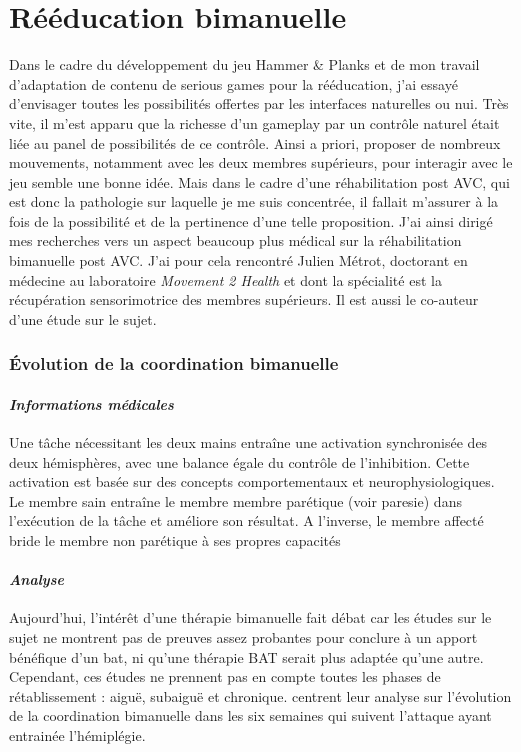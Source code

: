 	
\section{Rééducation bimanuelle} \label{bilateral}
	Dans le cadre du développement du jeu Hammer \& Planks et de mon travail d'adaptation de contenu de serious games pour la rééducation, j'ai essayé d'envisager toutes les possibilités offertes par les interfaces naturelles ou \gls{nui}. Très vite, il m'est apparu que la richesse d'un gameplay par un contrôle naturel était liée au panel de possibilités de ce contrôle. Ainsi a priori, proposer de nombreux mouvements, notamment avec les deux membres supérieurs, pour interagir avec le jeu semble une bonne idée. Mais dans le cadre d'une réhabilitation post \gls{AVC}, qui est donc la pathologie sur laquelle je me suis concentrée, il fallait m'assurer à la fois de la possibilité et de la pertinence d'une telle proposition. J'ai ainsi dirigé mes recherches vers un aspect beaucoup plus médical sur la réhabilitation bimanuelle post AVC. J'ai pour cela rencontré Julien Métrot, doctorant en médecine au laboratoire \emph{Movement 2 Health} et dont la spécialité est la récupération sensorimotrice des membres supérieurs. Il est aussi le co-auteur d'une étude sur le sujet.
	
		\subsubsection*{Évolution de la coordination bimanuelle} 
		
		\paragraph{\emph{Informations médicales}\\}
Une tâche nécessitant les deux mains entraîne une activation synchronisée des deux hémisphères, avec une balance égale du contrôle de l'inhibition. Cette activation est basée sur des concepts comportementaux et neurophysiologiques.\\
Le membre sain entraîne le membre membre parétique (voir \gls{paresie}) dans l'exécution de la tâche et améliore son résultat. A l'inverse, le membre affecté bride le membre non parétique à ses propres capacités		
		\paragraph{\emph{Analyse}\\}
Aujourd'hui, l'intérêt d'une thérapie bimanuelle fait débat car les études sur le sujet ne montrent pas de preuves assez probantes pour conclure à un apport bénéfique d'un \gls{bat}, ni qu'une thérapie BAT serait plus adaptée qu'une autre. Cependant, ces études ne prennent pas en compte toutes les phases de rétablissement : aiguë, subaiguë et chronique.\newline
[Metrot et al, 2013]\cite{Metr13} centrent leur analyse sur l'évolution de la coordination bimanuelle dans les six semaines qui suivent l'attaque ayant entrainée l'hémiplégie.

